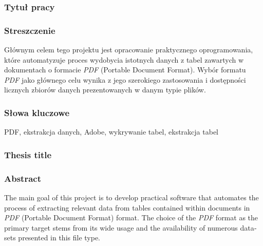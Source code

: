 \documentclass[a4paper,twoside,12pt]{book}
\begin{document}


\cleardoublepage

\rmfamily\normalfont
\pagestyle{empty}



\subsubsection*{Tytuł pracy} 
\Title

\subsubsection*{Streszczenie}  
Głównym celem tego projektu jest opracowanie praktycznego oprogramowania, które automatyzuje proces wydobycia istotnych danych z tabel zawartych w dokumentach o formacie \emph{PDF} (Portable Document Format). Wybór formatu \emph{PDF} jako głównego celu wynika z jego szerokiego zastosowania i dostępności licznych zbiorów danych prezentowanych w danym typie plików. 

\subsubsection*{Słowa kluczowe} 
PDF, ekstrakcja danych, Adobe, wykrywanie tabel, ekstrakcja tabel
\subsubsection*{Thesis title} 
\begin{otherlanguage}{british}
\TitleAlt
\end{otherlanguage}

\subsubsection*{Abstract} 
\begin{otherlanguage}{british}
The main goal of this project is to develop practical software that automates the process of extracting relevant data from tables contained within documents in \emph{PDF} (Portable Document Format) format. The choice of the \emph{PDF} format as the primary target stems from its wide usage and the availability of numerous datasets presented in this file type.
\end{otherlanguage}
\end{document}
